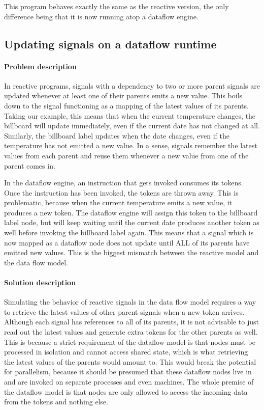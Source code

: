 This program behaves exactly the same as the reactive version, the only difference being that it is now running atop a dataflow engine.

\subsection{Updating signals on a dataflow runtime}

\paragraph{Problem description}

In reactive programs, signals with a dependency to two or more parent signals are updated whenever at least one of their parents emits a new value. This boils down to the signal functioning as a mapping of the latest values of its parents. Taking our example, this means that when the current temperature changes, the billboard will update immediately, even if the current date has not changed at all.
Similarly, the billboard label updates when the date changes, even if the temperature has not emitted a new value. In a sense, signals remember the latest values from each parent and reuse them whenever a new value from one of the parent comes in.

In the dataflow engine, an instruction that gets invoked consumes its tokens. Once the instruction has been invoked, the tokens are thrown away. This is problematic, because when the current temperature emits a new value, it produces a new token. The dataflow engine will assign this token to the billboard label node, but will keep waiting until the current date produces another token as well before invoking the billboard label again. This means that a signal which is now mapped as a dataflow node does not update until ALL of its parents have emitted new values. This is the biggest mismatch between the reactive model and the data flow model.

\paragraph{Solution description}

Simulating the behavior of reactive signals in the data flow model requires a way to retrieve the latest values of other parent signals when a new token arrives. 
Although each signal has references to all of its parents, it is not advisable to just read out the latest values and generate extra tokens for the other parents as well. This is because a strict requirement of the dataflow model is that nodes must be processed in isolation and cannot access shared state, which is what retrieving the latest values of the parents would amount to.  
This would break the potential for parallelism, because it should be presumed that these dataflow nodes live in and are invoked on separate processes and even machines. The whole premise of the dataflow model is that nodes are only allowed to access the incoming data from the tokens and nothing else.

